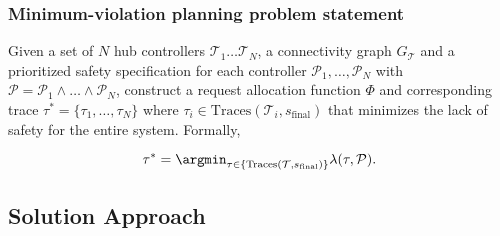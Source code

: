 \subsubsection{Minimum-violation planning problem statement} 
Given a set of $N$ hub controllers $\mathcal{T}_1 \dots \mathcal{T}_N$, a connectivity graph $G_{\mathcal{T}}$ and a prioritized safety specification for each controller $\mathcal{P}_1,\dots,\mathcal{P}_N$ with $\mathcal{P} = \mathcal{P}_1 \wedge \dots \wedge \mathcal{P}_N $, construct a request allocation function $\Phi$ and corresponding trace $\tau^* = \{\tau_1,\dots,\tau_N\}$ where  $\tau_i \in  \text{Traces}(\mathcal{T}_i,s_{\text{final}})$ that minimizes the lack of safety for the entire system. Formally,

\begin{equation}
    \tau^* = \argmin_{\tau \in \{\text{Traces}(\mathcal{T},s_{\text{final}})\}} \lambda(\tau, \mathcal{P}).
\end{equation}


\subsection{Solution Approach}

